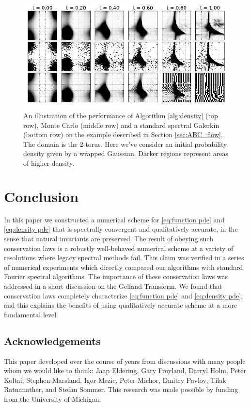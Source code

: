 \documentclass[final,leqno]{siamart}
\begin{document}
\begin{figure}[p]
	\centering
	\includegraphics[width=1\textwidth]{./images/ABCD_flow.png}
	\caption{An illustration of the performance of Algorithm \ref{alg:density} (top row), Monte Carlo (middle row) and a standard spectral Galerkin (bottom row) on the example described in Section \ref{sec:ABC_flow}.
	The domain is the $2$-torus.  Here we've consider an initial probability density given by a wrapped Gaussian. Darker regions represent areas of higher-density.}
	\label{fig:ABCD}
\end{figure}


\section{Conclusion}

In this paper we constructed a numerical scheme for \eqref{eq:function pde} and \eqref{eq:density pde} that is spectrally convergent and qualitatively accurate, in the sense that natural invariants are preserved.
The result of obeying such conservation laws is a robustly well-behaved numerical scheme at a variety of resolutions where legacy spectral methods fail.
This claim was verified in a series of numerical experiments which directly compared our algorithms with standard Fourier spectral algorithms.
The importance of these conservation laws was addressed in a short discussion on the Gelfand Transform.
We found that conservation laws completely characterize \eqref{eq:function pde} and \eqref{eq:density pde}, and this explains the benefits of using qualitatively accurate scheme at a more fundamental level.


\subsection{Acknowledgements}
This paper developed over the course of years from discussions with many people whom we would like to thank: Jaap Eldering, Gary Froyland,
 	Darryl Holm, Peter Koltai, Stephen Marsland, Igor Mezic, Peter Michor, Dmitry Pavlov, Tilak Ratnanather, and Stefan Sommer. 
This research was made possible by funding from the University of Michigan.
\end{document}
